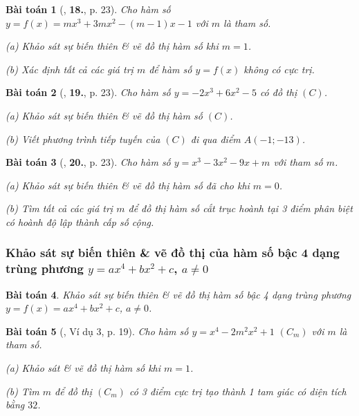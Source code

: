 \documentclass[12pt]{article}
\numberwithin{equation}{section}
\newtheorem{baitoan}{Bài toán}[section]
\begin{document}
\begin{baitoan}[\cite{TL_chuyen_Toan_Giai_Tich_12}, \textbf{18.}, p. 23]
	Cho hàm số $y = f(x) = mx^3 + 3mx^2 - (m - 1)x - 1$ với $m$ là tham số.
	\begin{enumerate*}
		\item[(a)] Khảo sát sự biến thiên \& vẽ đồ thị hàm số khi $m = 1$.
		\item[(b)] Xác định tất cả các giá trị $m$ để hàm số $y = f(x)$ không có cực trị.
	\end{enumerate*}
\end{baitoan}

\begin{baitoan}[\cite{TL_chuyen_Toan_Giai_Tich_12}, \textbf{19.}, p. 23]
	Cho hàm số $y = -2x^3 + 6x^2 - 5$ có đồ thị $(C)$.
	\begin{enumerate*}
		\item[(a)] Khảo sát sự biến thiên \& vẽ đồ thị hàm số $(C)$.
		\item[(b)] Viết phương trình tiếp tuyến của $(C)$ đi qua điểm $A(-1;-13)$.
	\end{enumerate*}
\end{baitoan}

\begin{baitoan}[\cite{TL_chuyen_Toan_Giai_Tich_12}, \textbf{20.}, p. 23]
	Cho hàm số $y = x^3 - 3x^2 - 9x + m$ với tham số $m$.
	\begin{enumerate*}
		\item[(a)] Khảo sát sự biến thiên \& vẽ đồ thị hàm số đã cho khi $m = 0$.
		\item[(b)] Tìm tất cả các giá trị $m$ để đồ thị hàm số cắt trục hoành tại 3 điểm phân biệt có hoành độ lập thành cấp số cộng.
	\end{enumerate*}
\end{baitoan}

\subsubsection{Khảo sát sự biến thiên \& vẽ đồ thị của hàm số bậc 4 dạng trùng phương $y = ax^4 + bx^2 + c$, $a\ne 0$}

\begin{baitoan}
	Khảo sát sự biến thiên \& vẽ đồ thị hàm số bậc 4 dạng trùng phương $y = f(x) = ax^4 + bx^2 + c$, $a\ne 0$.
\end{baitoan}

\begin{baitoan}[\cite{TL_chuyen_Toan_Giai_Tich_12}, Ví dụ 3, p. 19]
	Cho hàm số $y = x^4 - 2m^2x^2 + 1$ $(C_m)$ với $m$ là tham số.
	\begin{enumerate*}
		\item[(a)] Khảo sát \& vẽ đồ thị hàm số khi $m = 1$.
		\item[(b)] Tìm $m$ để đồ thị $(C_m)$ có 3 điểm cực trị tạo thành 1 tam giác có diện tích bằng $32$.
	\end{enumerate*}
\end{baitoan}
\end{document}
